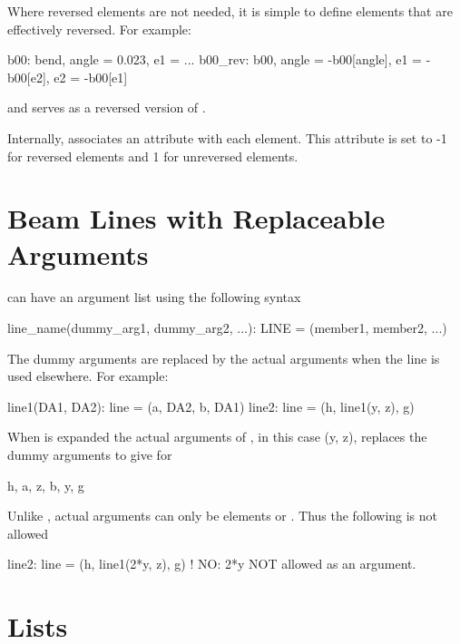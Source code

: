 Where reversed elements are not needed, it is simple to define elements that are
effectively reversed. For example:
\begin{example}
  b00: bend, angle = 0.023, e1 = ...
  b00_rev: b00, angle = -b00[angle], e1 = -b00[e2], e2 = -b00[e1]
\end{example}
and  serves as a reversed version of .

Internally, \bmad associates an  attribute with each element. This attribute is set
to -1 for reversed elements and 1 for unreversed elements.

\section{Beam Lines with Replaceable Arguments}
\label{s:lines.with.arg}

 can have an argument list using the following syntax
\begin{example}
  line_name(dummy_arg1, dummy_arg2, ...): LINE = (member1, member2, ...)
\end{example}
The dummy arguments are replaced by the actual arguments when the line is used
elsewhere. For example:
\begin{example}
  line1(DA1, DA2): line = (a, DA2, b, DA1)
  line2: line = (h, line1(y, z), g)
\end{example}
When  is expanded the actual arguments of , in this case \vn(y, z), replaces the
dummy arguments  to give for 
\begin{example}
  h, a, z, b, y, g
\end{example} 
Unlike \mad,  actual arguments can only be elements or . 
Thus the following is not allowed
\begin{example}
  line2: line = (h, line1(2*y, z), g)   ! NO: 2*y NOT allowed as an argument.
\end{example}

\section{Lists}
\label{s:replace.list}


